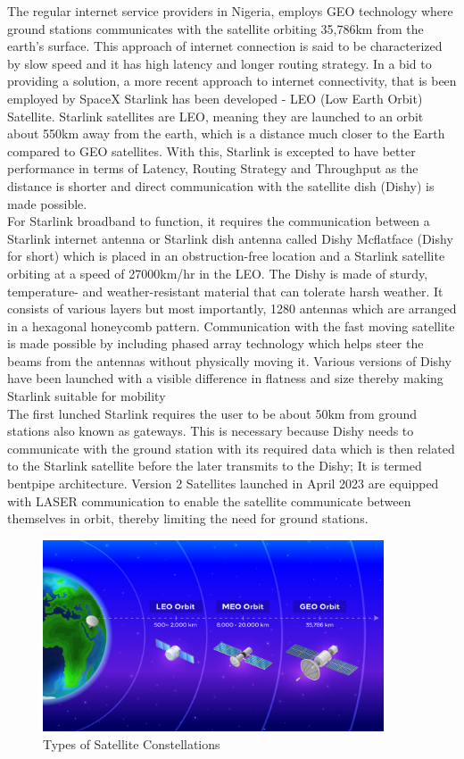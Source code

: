 	The regular internet service providers in Nigeria, employs GEO technology where ground stations communicates with the satellite orbiting 35,786km from the earth's surface. This approach of internet connection is said to be characterized by slow speed and it has high latency and longer routing strategy.
	In a bid to providing a solution, a more recent approach to internet connectivity, that is been employed by SpaceX Starlink has been developed -  LEO (Low Earth Orbit) Satellite.
	Starlink satellites are LEO, meaning they are launched to an orbit about 550km away from the earth, which is a distance much closer to the Earth compared to GEO satellites. With this, Starlink is excepted to have better performance in terms of Latency, Routing Strategy and Throughput as the distance is shorter and direct communication with the satellite dish (Dishy) is made possible.\\
	For Starlink broadband to function, it requires the communication between a Starlink internet antenna or Starlink dish antenna called Dishy Mcflatface (Dishy for short) which is placed in an obstruction-free location and a Starlink satellite orbiting at a speed of 27000km/hr in the LEO.
	The Dishy is made of sturdy, temperature- and weather-resistant material that can tolerate harsh weather. It consists of various layers but most importantly, 1280 antennas which are arranged in a hexagonal honeycomb pattern. Communication with the fast moving satellite is made possible by including phased array technology which helps steer the beams from the antennas without physically moving it. Various versions of Dishy have been launched with a visible difference in flatness and size thereby making Starlink suitable for mobility\\
	The first lunched Starlink requires the user to be about 50km from ground stations also known as gateways. This  is necessary because Dishy needs to communicate with the ground station with its required data which is then related to the Starlink satellite before the later transmits to the Dishy; It is termed bentpipe architecture. Version 2 Satellites launched in April 2023 are equipped with LASER communication to enable the satellite communicate between themselves in orbit, thereby limiting the need for ground stations.
	
\begin{figure}[H]
\centering
\includegraphics[width=0.9\textwidth]{space orbits}
\caption{Types of Satellite Constellations}
\end{figure}

